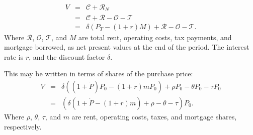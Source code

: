 \begin{eqnarray}
V &=& \mathcal{C} + \mathcal{R}_N  \label{eqn-property-investment-value0}\\
  &=& \mathcal{C} + \mathcal{R} - \mathcal{O} - \mathcal{T} \nonumber \\
  &=& \delta \left(P_T- \left(1+r\right)M\right) + \mathcal{R} - \mathcal{O} - \mathcal{T}.
\label{eqn-property-investment-value1}
\end{eqnarray}
 Where $\mathcal{R}$, $\mathcal{O}$, $\mathcal{T}$, and $M$ are total rent, operating costs, tax payments, and mortgage borrowed, as net present values at the end of the period. The interest rate is $r$, and the discount factor $\delta$. %

 This may be written in terms of shares of the purchase price:
\begin{eqnarray}
V &=& \delta \left((1+\dot P) P_0 - (1+r)mP_0\right) + \rho P_0 - \theta P_0 - \tau P_0 \nonumber \\
  &=& \left(\delta \left(1+\dot P - (1+r)m   \right) + \rho     - \theta     - \tau\right) P_0.
\label{eqn-property-investment-value2}
\end{eqnarray}
 Where $\rho$, $\theta$, $\tau$, and $m$ are rent, operating costs, taxes, and mortgage shares, respectively. %

